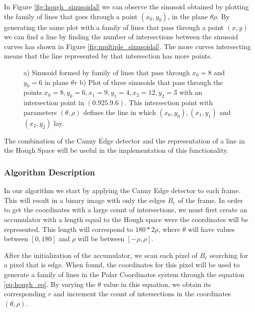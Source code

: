In Figure \ref{fig:hough_sinusoidal} we can observe the sinusoid obtained by plotting the family of lines that goes through a point $(x_{0}, y_{0})$, in the plane $\theta \rho$. By generating the same plot with a family of lines that pass through a point $(x, y)$ we can find a line by finding the number of intersections between the sinusoid curves has shown in Figure \ref{fig:multiple_sinusoidal}. The more curves intersecting means that the line represented by that intersection has more points\cite{OCV}.
\begin{figure}[htbp]
	\centering
  \caption{a) Sinusoid formed by family of lines that pass through $x_{0} =8$ and $y_{0} = 6$ in plane $\theta r$ b) Plot of three sinusoids that pass through the points $x_{0} = 8,y_{0} = 6, x_{1} = 9,y_{1} = 4, x_{2} = 12, y_{2} = 3$ with an intersection point in $(0.925.9.6)$. This intersection point with parameters $(\theta,\rho)$ defines the line in which $(x_{0},y_{0}), (x_{1},y_{1})$ and $(x_{2},y_{2})$ lay\cite{OCV}.}
\end{figure}

The combination of the Canny Edge detector and the representation of a line in the Hough Space will be useful in the implementation of this functionality.

\subsubsection{Algorithm Description}

In our algorithm we start by applying the Canny Edge detector to each frame. This will result in a binary image with only the edges $B_{e}$ of the frame. In order to get the coordinates with a large count of intersections, we must first create an accumulator with a length equal to the Hough space were the coordinates will be represented. This length will correspond to $180 * 2\rho$, where $\theta$ will have values between $[0,180]$ and $\rho$ will be between $[-\rho,\rho]$.

After the initialization of the accumulator, we scan each pixel of $B_{e}$ searching for a pixel that is edge. When found, the coordinates for this pixel will be used to generate a family of lines in the Polar Coordinates system through the equation \ref{eq:hough_eq}. By varying the $\theta$ value in this equation, we obtain its corresponding $r$ and increment the count of intersections in the coordinates $(\theta,\rho)$.

